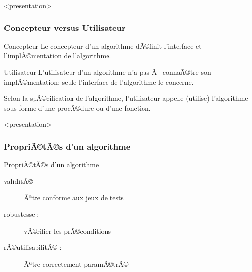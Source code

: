 \begin{frame}<presentation>
\frametitle{Concepteur versus Utilisateur}
\begin{block}{Concepteur}
Le concepteur d'un algorithme dÃ©finit l'interface et 
l'implÃ©mentation de l'algorithme.
\end{block}
\pause
\begin{block}{Utilisateur}
L'utilisateur d'un algorithme n'a pas Ã  connaÃ®tre son
implÃ©mentation; seule l'interface de l'algorithme le concerne.

\pause
Selon la spÃ©cification de l'algorithme,
l'utilisateur \alert{appelle} (utilise) l'algorithme sous forme d'une
\alert{procÃ©dure} ou d'une \alert{fonction}.
\end{block}

\end{frame}
\note{}



\begin{frame}<presentation>
\frametitle{PropriÃ©tÃ©s d'un algorithme}
\begin{block}{PropriÃ©tÃ©s d'un algorithme}
\begin{description}
\item[validitÃ© :] Ãªtre conforme aux jeux de tests
\pause
\item[robustesse :] vÃ©rifier les prÃ©conditions
\pause
\item[rÃ©utilisabilitÃ© :] Ãªtre correctement paramÃ©trÃ©
\end{description}
\end{block} 

\end{frame}


